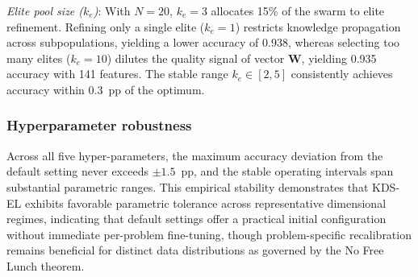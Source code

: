 \textit{Elite pool size ($k_e$)}: With $N=20$, $k_e=3$ allocates 15\% of the swarm to elite refinement. Refining only a single elite ($k_e=1$) restricts knowledge propagation across subpopulations, yielding a lower accuracy of 0.938, whereas selecting too many elites ($k_e=10$) dilutes the quality signal of vector $\mathbf{W}$, yielding 0.935 accuracy with 141 features. The stable range $k_e \in [2, 5]$ consistently achieves accuracy within 0.3~pp of the optimum.

\subsubsection{Hyperparameter robustness}

Across all five hyper-parameters, the maximum accuracy deviation from the default setting never exceeds $\pm 1.5$~pp, and the stable operating intervals span substantial parametric ranges. This empirical stability demonstrates that KDS-EL exhibits favorable parametric tolerance across representative dimensional regimes, indicating that default settings offer a practical initial configuration without immediate per-problem fine-tuning, though problem-specific recalibration remains beneficial for distinct data distributions as governed by the No Free Lunch theorem.
